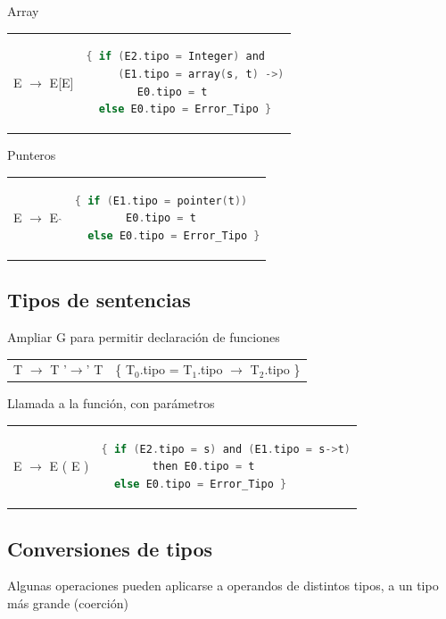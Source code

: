 \documentclass[12pt, twoside, openright]{report} %
\begin{document}
Array
\begin{table}[H]
	\begin{tabular}{ll}
		E $\rightarrow$ E[E] &
		\textbf{ } \begin{lstlisting}[language=C]
{ if (E2.tipo = Integer) and
     (E1.tipo = array(s, t) ->)
        E0.tipo = t
  else E0.tipo = Error_Tipo }
\end{lstlisting} \\
	\end{tabular}
\end{table}

Punteros
\begin{table}[H]
	\begin{tabular}{ll}
		E $\rightarrow$ E $\hat{}$ &
		\textbf{ } \begin{lstlisting}[language=C]
{ if (E1.tipo = pointer(t))
        E0.tipo = t
  else E0.tipo = Error_Tipo }
\end{lstlisting} \\
	\end{tabular}
\end{table}

\subsection{Tipos de sentencias}
Ampliar G para permitir declaración de funciones
\begin{table}[H]
	\begin{tabular}{ll}
		T $\rightarrow$ T '$\rightarrow$' T & \{ T$_0$.tipo = T$_1$.tipo $\rightarrow$ T$_2$.tipo \} \\
	\end{tabular}
\end{table}

Llamada a la función, con parámetros
\begin{table}[H]
	\begin{tabular}{ll}
		E $\rightarrow$ E ( E ) &
		\textbf{ } \begin{lstlisting}[language=C]
{ if (E2.tipo = s) and (E1.tipo = s->t)
        then E0.tipo = t
  else E0.tipo = Error_Tipo }
\end{lstlisting} \\
	\end{tabular}
\end{table}

\subsection{Conversiones de tipos}
Algunas operaciones pueden aplicarse a operandos de distintos tipos, a un tipo más grande  (coerción)
\end{document}
